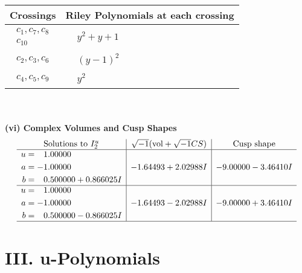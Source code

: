 \documentclass[1p]{elsarticle_modified}
\theoremstyle{definition}
\newcommand{\I}{\sqrt{-1}}
\begin{document}
\begin{tabular}{m{50pt}|m{274pt}}
Crossings & \hspace{64pt}Riley Polynomials at each crossing \\
\hline $$\begin{aligned}c_{1},c_{7},c_{8}\\c_{10}\end{aligned}$$&$\begin{aligned}
&y^2+y+1
\end{aligned}$\\
\hline $$\begin{aligned}c_{2},c_{3},c_{6}\end{aligned}$$&$\begin{aligned}
&(y-1)^2
\end{aligned}$\\
\hline $$\begin{aligned}c_{4},c_{5},c_{9}\end{aligned}$$&$\begin{aligned}
&y^2
\end{aligned}$\\
\hline
\end{tabular}\\~\\
\newpage\flushleft \textbf{(vi) Complex Volumes and Cusp Shapes}
$$\begin{array}{c|c|c}  
\text{Solutions to }I^u_{2}& \I (\text{vol} + \sqrt{-1}CS) & \text{Cusp shape}\\
 \hline 
\begin{aligned}
u &= \phantom{-}1.00000\phantom{ +0.000000I} \\
a &= -1.00000\phantom{ +0.000000I} \\
b &= \phantom{-}0.500000 + 0.866025 I\end{aligned}
 & -1.64493 + 2.02988 I & -9.00000 - 3.46410 I \\ \hline\begin{aligned}
u &= \phantom{-}1.00000\phantom{ +0.000000I} \\
a &= -1.00000\phantom{ +0.000000I} \\
b &= \phantom{-}0.500000 - 0.866025 I\end{aligned}
 & -1.64493 - 2.02988 I & -9.00000 + 3.46410 I\\
 \hline 
 \end{array}$$\newpage
\newpage\renewcommand{\arraystretch}{1}
\centering \section*{ III. u-Polynomials}
\end{document}
